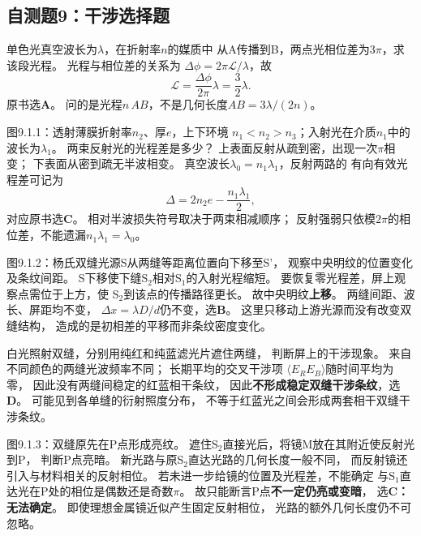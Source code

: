 \subsection{自测题9：干涉选择题}

\problemtext 单色光真空波长为$\lambda$，在折射率$n$的媒质中
从A传播到B，两点光相位差为$3\pi$，求该段光程。
\workings
光程与相位差的关系为
$\Delta\phi=2\pi\mathcal L/\lambda$，故
\[
\boxed{\mathcal L=\frac{\Delta\phi}{2\pi}\lambda=\frac32\lambda}.
\]
原书选\textbf{A}。
\crosscheck 问的是光程$n\,AB$，不是几何长度$AB=3\lambda/(2n)$。

\problemtext 图9.1.1：透射薄膜折射率$n_2$、厚$e$，上下环境
$n_1<n_2>n_3$；入射光在介质$n_1$中的波长为$\lambda_1$。
两束反射光的光程差是多少？
\workings
上表面反射从疏到密，出现一次$\pi$相变；
下表面从密到疏无半波相变。
真空波长$\lambda_0=n_1\lambda_1$，反射两路的
有向有效光程差可记为
\[
\boxed{\Delta=2n_2e-\frac{n_1\lambda_1}{2}},
\]
对应原书选\textbf{C}。
\crosscheck 相对半波损失符号取决于两束相减顺序；
反射强弱只依模$2\pi$的相位差，不能遗漏$n_1\lambda_1=\lambda_0$。

\problemtext 图9.1.2：杨氏双缝光源S从两缝等距离位置向下移至S'，
观察中央明纹的位置变化及条纹间距。
\workings
S下移使下缝S$_2$相对S$_1$的入射光程缩短。
要恢复零光程差，屏上观察点需位于上方，使
S$_2$到该点的传播路径更长。
故中央明纹\textbf{上移}。
两缝间距、波长、屏距均不变，
$\Delta x=\lambda D/d$仍不变，选\textbf{B}。
\crosscheck 这里只移动上游光源而没有改变双缝结构，
造成的是初相差的平移而非条纹密度变化。

\problemtext 白光照射双缝，分别用纯红和纯蓝滤光片遮住两缝，
判断屏上的干涉现象。
\workings
来自不同颜色的两缝光波频率不同；
长期平均的交叉干涉项
$\langle E_R E_B\rangle$随时间平均为零，
因此没有两缝间稳定的红蓝相干条纹，
因此\textbf{不形成稳定双缝干涉条纹}，选\textbf{D}。
\crosscheck 可能见到各单缝的衍射照度分布，
不等于红蓝光之间会形成两套相干双缝干涉条纹。

\problemtext 图9.1.3：双缝原先在P点形成亮纹。
遮住S$_2$直接光后，将镜M放在其附近使反射光到P，
判断P点亮暗。
\workings
新光路与原S$_2$直达光路的几何长度一般不同，
而反射镜还引入与材料相关的反射相位。
若未进一步给镜的位置及光程差，不能确定
与S$_1$直达光在P处的相位是偶数还是奇数$\pi$。
故只能断言P点\textbf{不一定仍亮或变暗}，
选\textbf{C：无法确定}。
\crosscheck 即使理想金属镜近似产生固定反射相位，
光路的额外几何长度仍不可忽略。

